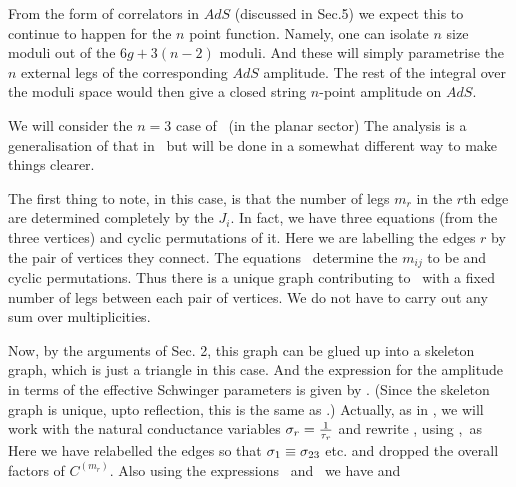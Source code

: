 From the form of correlators in $AdS$ (discussed in Sec.5)  
we expect this to continue to happen for the $n$ point function. Namely, one can 
isolate $n$ size moduli out of the $6g+3(n-2)$ moduli. And these will simply 
parametrise the $n$ external legs of the corresponding $AdS$ amplitude. The rest
of the integral over the moduli space would then give a closed string $n$-point
amplitude on $AdS$. 





We will consider the $n=3$ case of \ncorr\ (in the planar sector) 
\eqn{} 
The analysis is a 
generalisation of that in \ff\ but will be done
in a somewhat different way to make things clearer.

The first thing to note, in this case, is that the number of legs 
$m_r$ in the $r$th edge are determined
completely by the $J_i$. 
In fact, we have three equations (from the three vertices) 
\eqn{}
and cyclic permutations of it. Here we are labelling the edges $r$ by the pair of 
vertices they connect. The equations \multp\ determine the $m_{ij}$ to be 
\eqn{}
and cyclic permutations. Thus there is a unique graph contributing to 
\nthree\ with a fixed number of 
legs between each pair of vertices. We do not have to carry out 
any sum over multiplicities.

Now, by the arguments of Sec. 2, this graph can be glued up into a skeleton graph,
which is just a triangle in this case. 
And the expression for the amplitude in terms of
the effective Schwinger parameters is given by \fincont . 
(Since the skeleton graph 
is unique, upto reflection, this is the same as \totcont .) Actually, as in 
\cellcont , we will work with the natural 
conductance variables ${\sigma}_r={1\over {\tau}_r}$
and rewrite \fincont , using \newmeas ,\newgauss\  as
\eqn{}
Here we have relabelled the edges so that ${\sigma}_1\equiv {\sigma}_{23}$ etc. and dropped 
the overall factors of $C^{(m_r)}$.  
Also using the expressions \newmeas\ and \newgauss\ we have 
\eqn{}
and 
\eqn{}

